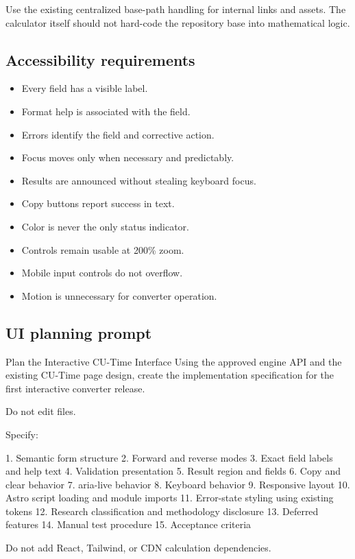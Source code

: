 \documentclass[11pt,letterpaper]{article}
\begin{document}
Use the existing centralized base-path handling for internal links and assets.
The calculator itself should not hard-code the repository base into mathematical
logic.

\subsection{Accessibility requirements}

\begin{itemize}
    \item Every field has a visible label.
    \item Format help is associated with the field.
    \item Errors identify the field and corrective action.
    \item Focus moves only when necessary and predictably.
    \item Results are announced without stealing keyboard focus.
    \item Copy buttons report success in text.
    \item Color is never the only status indicator.
    \item Controls remain usable at 200\% zoom.
    \item Mobile input controls do not overflow.
    \item Motion is unnecessary for converter operation.
\end{itemize}

\subsection{UI planning prompt}

\begin{promptbox}{Plan the Interactive CU-Time Interface}
Using the approved engine API and the existing CU-Time page design,
create the implementation specification for the first interactive
converter release.

Do not edit files.

Specify:

1. Semantic form structure
2. Forward and reverse modes
3. Exact field labels and help text
4. Validation presentation
5. Result region and fields
6. Copy and clear behavior
7. aria-live behavior
8. Keyboard behavior
9. Responsive layout
10. Astro script loading and module imports
11. Error-state styling using existing tokens
12. Research classification and methodology disclosure
13. Deferred features
14. Manual test procedure
15. Acceptance criteria

Do not add React, Tailwind, or CDN calculation dependencies.
\end{promptbox}
\end{document}
